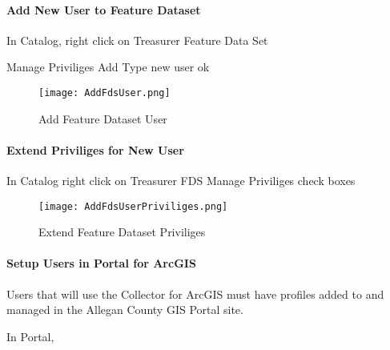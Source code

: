  \paragraph[Add New User to Feature Dataset]{\Large Add New User to Feature Dataset\texorpdfstring{\\}{}}
 \vspace{.35in}

 In Catalog, \rtArrow right click on Treasurer Feature Data Set
 \vspace{.15in}

 \rtArrow Manage \rtArrow Priviliges \rtArrow Add \rtArrow Type new user \rtArrow ok
 \vspace{.5in}

 \begin{figure}[h!]
 \centering
     \texttt{[image: AddFdsUser.png]}
 \caption{Add Feature Dataset User}
 \end{figure}
 \clearpage
 \paragraph[Extend Priviliges for New User]{\Large Extend Priviliges for New User\texorpdfstring{\\}{}}
 \vspace{.5in}

 In Catalog \rtArrow right click on Treasurer FDS \rtArrow Manage \rtArrow Priviliges \rtArrow check boxes
 \vspace{.5in}

 \begin{figure}[h!]
 \centering
     \texttt{[image: AddFdsUserPriviliges.png]}
 \caption{Extend Feature Dataset Priviliges}
 \end{figure}
 \clearpage
 \paragraph[Setup Users in Portal for ArcGIS]{\Large Setup Users in Portal for ArcGIS\texorpdfstring{\\}{}}
 \vspace{.5in}

 \noindent Users that will use the Collector for ArcGIS must have profiles added to and managed in the Allegan County GIS Portal site.
 \vspace{.5in}

 In Portal, \rtArrow {}

